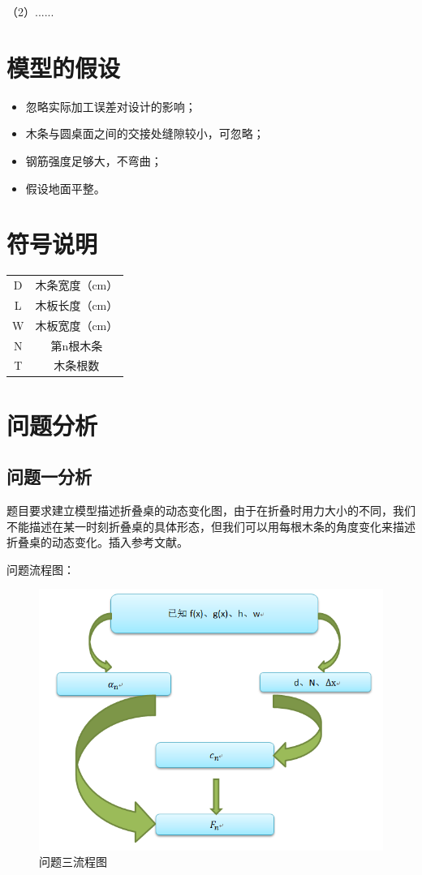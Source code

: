 \documentclass{whutmod}
\begin{document}
（2）......


\section{模型的假设}

\begin{itemize}
	\item 忽略实际加工误差对设计的影响；
	\item 木条与圆桌面之间的交接处缝隙较小，可忽略；
	\item 钢筋强度足够大，不弯曲；
	\item 假设地面平整。
\end{itemize}

\section{符号说明}
\begin{center}
	\begin{tabular}{cc}
		\hline
		\makebox[0.3\textwidth][c]{符号}	&  \makebox[0.4\textwidth][c]{意义} \\ \hline
		D	    & 木条宽度（cm） \\ \hline
		L	    & 木板长度（cm）  \\ \hline
		W	    & 木板宽度（cm）  \\ \hline
		N	    & 第n根木条  \\ \hline
		T	    & 木条根数  \\ \hline
	\end{tabular}
\end{center}

\section{问题分析}

\subsection{问题一分析}
题目要求建立模型描述折叠桌的动态变化图，由于在折叠时用力大小的不同，我们不能描述在某一时刻折叠桌的具体形态，但我们可以用每根木条的角度变化来描述折叠桌的动态变化。插入参考文献\cite{bib:one}。

问题流程图：
\begin{figure}[!h]
	\centering
	\includegraphics[width=.6\textwidth]{1.png}
	\caption{问题三流程图}
\end{figure}
\end{document}
